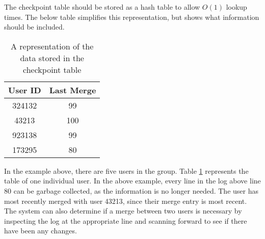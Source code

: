 The checkpoint table should be stored as a hash table to allow $O(1)$ lookup times. The below
table simplifies this representation, but shows what information should be included.

\begin{table}[h!]
\begin{center}
 \begin{tabular} {|c|c|}
  \hline
  User ID & Last Merge \\
  \hline \hline
   324132 & 99 \\
  \hline
   43213 & 100 \\
  \hline
   923138 & 99 \\
  \hline
   173295 & 80 \\
  \hline
 \end{tabular}
\end{center}
\caption{A representation of the data stored in the checkpoint table}
\label{table:checkpoint_table}
\end{table}

In the example above, there are five users in the group.
Table \ref{table:checkpoint_table} represents the table of one individual user.
In the above example, every line in the log above line 80 can be garbage collected, as
the information is no longer needed. The user has most recently merged with user 43213,
since their merge entry is most recent. The system can also determine if a merge between
two users is necessary by inspecting the log at the appropriate line and scanning forward
to see if there have been any changes.














